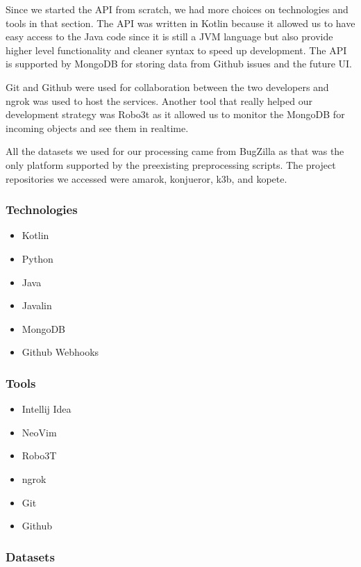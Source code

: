 \documentclass[12pt]{article}
\providecommand{\tightlist}{%
  \setlength{\itemsep}{0pt}\setlength{\parskip}{0pt}}
\begin{document}
Since we started the API from scratch, we had more choices on
technologies and tools in that section. The API was written in Kotlin
because it allowed us to have easy access to the Java code since it is
still a JVM language but also provide higher level functionality and
cleaner syntax to speed up development. The API is supported by MongoDB
for storing data from Github issues and the future UI.

Git and Github were used for collaboration between the two developers
and ngrok was used to host the services. Another tool that really helped
our development strategy was Robo3t as it allowed us to monitor the
MongoDB for incoming objects and see them in realtime.

All the datasets we used for our processing came from BugZilla as that
was the only platform supported by the preexisting preprocessing
scripts. The project repositories we accessed were amarok, konjueror,
k3b, and kopete.

\subsubsection{Technologies}\label{technologies}

\begin{itemize}
\tightlist
\item
  Kotlin
\item
  Python
\item
  Java
\item
  Javalin
\item
  MongoDB
\item
  Github Webhooks
\end{itemize}

\subsubsection{Tools}\label{tools}

\begin{itemize}
\tightlist
\item
  Intellij Idea
\item
  NeoVim
\item
  Robo3T
\item
  ngrok
\item
  Git
\item
  Github
\end{itemize}

\subsubsection{Datasets}\label{datasets}
\end{document}
